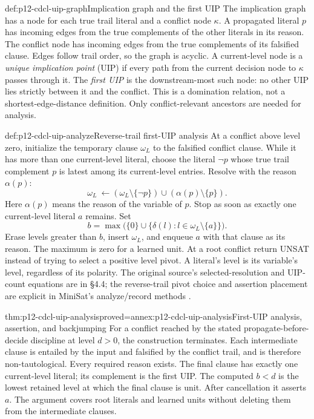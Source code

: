 \begin{hbdefinition}{def:p12-cdcl-uip-graph}{Implication graph and the first UIP}
The implication graph has a node for each true trail literal and a conflict
node \(\kappa\).  A propagated literal \(p\) has incoming edges from
the true complements of the other literals in its reason.  The conflict node
has incoming edges from the true complements of its falsified clause.
Edges follow trail order, so the graph is acyclic.  A current-level node is a
\emph{unique implication point} (UIP) if every path from the current
decision node to \(\kappa\) passes through it.  The \emph{first UIP} is
the downstream-most such node: no other UIP lies strictly between it and
the conflict.  This is a domination relation, not a shortest-edge-distance
definition.  Only conflict-relevant ancestors are needed for analysis.
\end{hbdefinition}

\begin{hbmethod}{def:p12-cdcl-uip-analyze}{Reverse-trail first-UIP analysis}
At a conflict above level zero, initialize the temporary clause \(\omega_L\)
to the falsified conflict clause.  While it has more than one current-level
literal, choose the literal \(\neg p\) whose true trail complement \(p\)
is latest among its current-level entries.  Resolve with the reason
\(\alpha(p)\):
\[
 \omega_L\ \gets
 (\omega_L\setminus\{\neg p\})\cup(\alpha(p)\setminus\{p\}).
\]
Here \(\alpha(p)\) means the reason of the variable of \(p\).
Stop as soon as exactly one current-level literal \(a\) remains.  Set
\[
 b=\max\bigl(\{0\}\cup
       \{\delta(l):l\in\omega_L\setminus\{a\}\}\bigr).
\]
Erase levels greater than \(b\), insert \(\omega_L\), and enqueue
\(a\) with that clause as its reason.  The maximum is zero for a learned
unit.  At a root conflict return UNSAT instead of trying to select a positive
level pivot.  A literal's level is its variable's level, regardless of its
polarity.  The original source's selected-resolution and UIP-count equations
are in §4.4; the reverse-trail pivot choice and assertion placement are explicit
in MiniSat's analyze/record methods
\cite[Eqs.~(4.16)--(4.18)]{MarquesSilvaLynceMalik2008CDCLManuscript}
\cite[Figs.~10--11]{EenSorenssonMiniSatExtended12}.
\end{hbmethod}

\begin{hbtheorem}{thm:p12-cdcl-uip-analysis}{proved=annex:p12-cdcl-uip-analysis}{First-UIP analysis, assertion, and backjumping}
For a conflict reached by the stated propagate-before-decide discipline at
level \(d>0\), the construction terminates.  Each intermediate clause is
entailed by the input and falsified by the conflict trail, and is therefore
non-tautological.  Every required reason exists.  The final clause has exactly
one current-level literal; its complement is the first UIP.  The computed
\(b<d\) is the lowest retained level at which the final clause is unit.
After cancellation it asserts \(a\).  The argument covers root literals and
learned units without deleting them from the intermediate clauses.
\end{hbtheorem}


